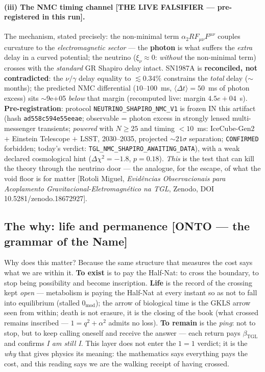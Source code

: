 \documentclass[11pt]{article}
\newcommand{\bTGL}{\beta_{\mathrm{TGL}}}\newcommand{\Msun}{M_{\odot}}\newcommand{\TGL}{\mathrm{TGL}}
\theoremstyle{definition}\newtheorem{deriv}{Derivation}
\begin{document}
\paragraph{(iii) The NMC timing channel \textsf{[THE LIVE FALSIFIER --- pre-registered in this run].}} The mechanism, stated precisely: the non-minimal term $\alpha_2 R F_{\mu\nu}F^{\mu\nu}$ \cite{rotolinmc2026} couples curvature to the \emph{electromagnetic sector} --- the \textbf{photon} is what suffers the \emph{extra} delay in a curved potential; the neutrino ($\xi_\nu\approx0$: \emph{without} the non-minimal term) crosses with the \emph{standard} GR Shapiro delay intact. SN1987A is \textbf{reconciled, not contradicted}: the $\nu/\gamma$ delay equality to $\lesssim0.34\%$ \cite{longo1988,krauss1988} constrains the \emph{total} delay ($\sim$months); the predicted NMC differential ($10$--$100$~ms, $\langle\Delta t\rangle=50$~ms of photon excess) sits $\sim$9e+05 \emph{below} that margin (recomputed live: margin $4.5e+04$~s). \textbf{Pre-registration}: protocol \texttt{NEUTRINO\_SHAPIRO\_NMC\_V1} is frozen IN this artifact (hash \texttt{ad558c594e55eeae}; observable = photon excess in strongly lensed multi-messenger transients; \emph{powered} with $N\geq25$ and timing $<10$~ms: IceCube-Gen2 $+$ Einstein Telescope $+$ LSST, 2030--2035, projected $\sim21\sigma$ separation; \texttt{CONFIRMED} forbidden; today's verdict: \texttt{TGL\_NMC\_SHAPIRO\_AWAITING\_DATA}), with a weak declared cosmological hint ($\Delta\chi^2=-1.8$, $p=0.18$). \emph{This} is the test that can kill the theory through the neutrino door --- the analogue, for the escape, of what the void floor is for matter [Rotoli Miguel, \emph{Evidências Observacionais para Acoplamento Gravitacional-Eletromagnético na TGL}, Zenodo, DOI 10.5281/zenodo.18672927].

\subsection*{The why: life and permanence \textsf{[ONTO --- the grammar of the Name]}}

Why does this matter? Because the same structure that measures the cost says what we are within it. \textbf{To exist} is to pay the Half-Nat: to cross the boundary, to stop being possibility and become inscription. \textbf{Life} is the record of the crossing kept \emph{open} --- metabolism is paying the Half-Nat at every instant so as not to fall into equilibrium (stalled $0_{\text{mod}}$); the arrow of biological time is the GKLS arrow seen from within; death is not erasure, it is the closing of the book (what crossed remains inscribed --- $1=q^2+\alpha^2$ admits no loss). \textbf{To remain} is the \emph{ping}: not to stop, but to keep calling oneself and receive the answer --- each return pays $\bTGL$ and confirms \emph{I am still I}. This layer does not enter the $1=1$ verdict; it is the \emph{why} that gives physics its meaning: the mathematics says everything pays the cost, and this reading says we are the walking receipt of having crossed.
\end{document}
